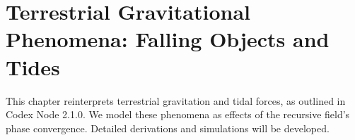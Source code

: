 \section{Terrestrial Gravitational Phenomena: Falling Objects and Tides}
This chapter reinterprets terrestrial gravitation and tidal forces, as outlined in Codex Node 2.1.0. We model these phenomena as effects of the recursive field’s phase convergence. Detailed derivations and simulations will be developed.